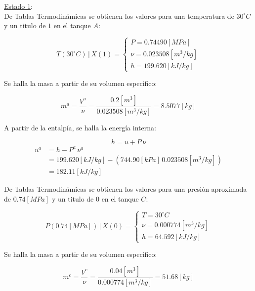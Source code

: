 \documentclass[letter,11pt]{article}
\begin{document}
\begin{enumerate}
\underline{Estado 1}: \\
De Tablas Termodinámicas se obtienen los valores para una temperatura
de $30^\circ C$ y un titulo de $1$ en el tanque $A$:

\begin{equation*}
    T(30^\circ C)\,|\,X(1) = \begin{cases}
        P = 0.74490[MPa] \\
        \nu = 0.023508[m^3/kg] \\
        h = 199.620[kJ/kg]
    \end{cases}
\end{equation*}

Se halla la masa a partir de su volumen especifico:

\begin{equation*}
    m^a = \frac{V^a}{\nu} = \frac{0.2[m^3]}{0.023508[m^3/kg]}
      = 8.5077[kg]
\end{equation*}

A partir de la entalpía, se halla la energía interna:

\begin{equation*}
    h = u + P\,\nu
\end{equation*}
\begin{equation*}
    \begin{split}
        u^a &= h - P^a\,\nu^a \\
            &= 199.620[kJ/kg] - (744.90[kPa]\,0.023508[m^3/kg]) \\
            &= 182.11[kJ/kg]
    \end{split}
\end{equation*}

De Tablas Termodinámicas se obtienen los valores para una presión aproximada
de $0.74[MPa]$ y un titulo de $0$ en el tanque $C$:

\begin{equation*}
    P(0.74[MPa])\,|\,X(0) = \begin{cases}
        T = 30^\circ C \\
        \nu = 0.000774[m^3/kg] \\
        h = 64.592[kJ/kg]
    \end{cases}
\end{equation*}

Se halla la masa a partir de su volumen especifico:

\begin{equation*}
    m^c = \frac{V^c}{\nu} = \frac{0.04[m^3]}{0.000774[m^3/kg]}
      = 51.68[kg]
\end{equation*}


\end{enumerate}
\end{document}
